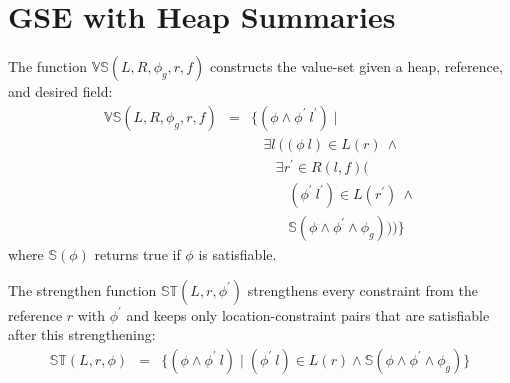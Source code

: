 \section{GSE with Heap Summaries}

The function $\mathbb{VS}(L,R,\phi_g,r,f)$ constructs the value-set given a
heap, reference, and desired field:
\[
\begin{array}{rcl}
  \mathbb{VS}(L,R,\phi_g,r,f) & = & \{(\phi\wedge\phi^\prime\ l^\prime) \mid \\
  & & \ \ \ \ \exists l\ ((\phi\ l) \in L(r)\ \wedge \\
  & & \ \ \ \ \ \ \ \ \exists r^\prime \in R(l,f) ( \\
  & & \ \ \ \ \ \ \ \ \ \ \ \ (\phi^\prime\ l^\prime) \in L(r^\prime)\ \wedge\\
  & & \ \ \ \ \ \ \ \ \ \ \ \ \mathbb{S}(\phi\wedge\phi^\prime\wedge \phi_g)))\}
\end{array}
\]
where $\mathbb{S}(\phi)$ returns true if $\phi$ is satisfiable.

The strengthen function $\mathbb{ST}(L,r,\phi^\prime)$ strengthens every
constraint from the reference $r$ with $\phi^\prime$ and keeps only location-constraint
pairs that are satisfiable after this strengthening:
\[
\begin{array}{rcl} 
\mathbb{ST}(L,r,\phi) & = & \{ (\phi\wedge\phi^\prime\ l) \mid 
(\phi^\prime\ l)\in L(r)\wedge\mathbb{S}(\phi\wedge\phi^\prime\wedge\phi_g) \}
\end{array}
\]



